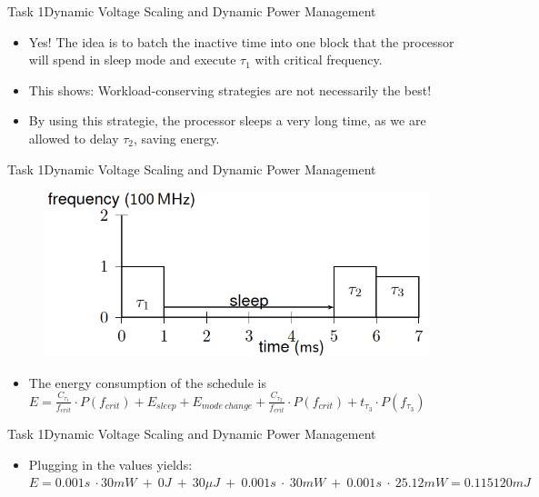\begin{frame}{Task 1}{Dynamic Voltage Scaling and Dynamic Power Management}
    \begin{solutionnoinc}
        \begin{itemize}
            \item Yes! The idea is to batch the inactive time into one block that the processor will spend in sleep mode and execute $\tau_1$ with critical frequency.
            \item This shows: Workload-conserving strategies are \alert{not} necessarily the best!
            \item By using this strategie, the processor sleeps a very long time, as we are allowed to delay $\tau_2$, saving energy.
        \end{itemize}
    \end{solutionnoinc}
\end{frame}
\begin{frame}{Task 1}{Dynamic Voltage Scaling and Dynamic Power Management}
    \begin{solutionnoinc}
        \begin{figure}
            \centering
            \includegraphics[scale = 0.5]{figures/scheduleF).PNG}
        \end{figure}
        \begin{itemize}
            \item The energy consumption of the schedule is $E = \frac{C_{\tau_1}}{f_{crit}} \cdot P(f_{crit}) + E_{sleep} + E_{mode\ change} + \frac{C_{\tau_2}}{f_{crit}} \cdot P(f_{crit}) + t_{\tau_3} \cdot P(f_{\tau_3})$
        \end{itemize}
    \end{solutionnoinc}
\end{frame}
\begin{frame}{Task 1}{Dynamic Voltage Scaling and Dynamic Power Management}
    \begin{solution}
        \begin{itemize}
            \item Plugging in the values yields: $E = 0.001s\  \cdot 30mW\  +\  0J\  +\  30\mu J\  +\  0.001s\  \cdot\  30mW\  +\  0.001s\  \cdot\  25.12mW = 0.115120 mJ$
        \end{itemize}
    \end{solution}
\end{frame}
